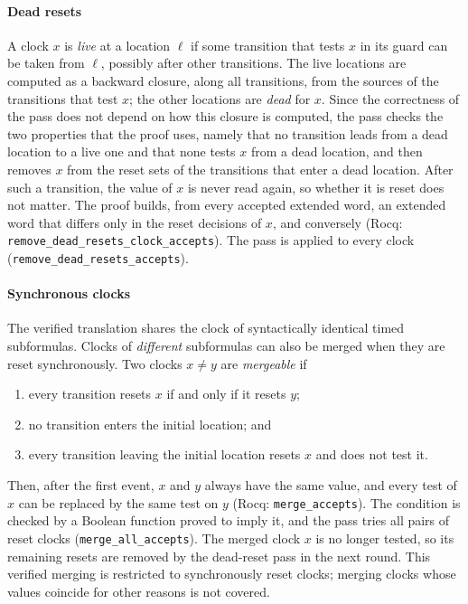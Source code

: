 \paragraph{Dead resets}
A clock $x$ is \emph{live} at a location $\ell$ if some transition that tests
$x$ in its guard can be taken from $\ell$, possibly after other transitions.
The live locations are computed as a backward closure, along all
transitions, from the sources of the transitions that test $x$; the other
locations are \emph{dead} for $x$.  Since the correctness of the pass does
not depend on how this closure is computed, the pass checks the two
properties that the proof uses, namely that no transition leads from a dead
location to a live one and that none tests $x$ from a dead location, and then removes $x$ from the reset sets of the
transitions that enter a dead location.  After such a transition, the value of
$x$ is never read again, so whether it is reset does not matter.  The proof
builds, from every accepted extended word, an extended word that differs only
in the reset decisions of $x$, and conversely (Rocq:
\texttt{remove\_\allowbreak{}dead\_\allowbreak{}resets\_\allowbreak{}clock\_\allowbreak{}accepts}).  The pass is applied
to every clock (\texttt{remove\_\allowbreak{}dead\_\allowbreak{}resets\_\allowbreak{}accepts}).

\paragraph{Synchronous clocks}
The verified translation shares the clock of syntactically identical timed
subformulas.  Clocks of \emph{different} subformulas can also be merged when
they are reset synchronously.  Two clocks $x\neq y$ are \emph{mergeable} if
\begin{enumerate}[label=(\roman*)]
  \item every transition resets $x$ if and only if it resets $y$;
  \item no transition enters the initial location; and
  \item every transition leaving the initial location resets $x$ and does not
        test it.
\end{enumerate}
Then, after the first event, $x$ and $y$ always have the same value, and every
test of $x$ can be replaced by the same test on $y$ (Rocq:
\texttt{merge\_\allowbreak{}accepts}).  The condition is checked by a Boolean function
proved to imply it, and the pass tries all pairs of reset clocks
(\texttt{merge\_\allowbreak{}all\_\allowbreak{}accepts}).  The merged clock $x$ is no longer tested,
so its remaining resets are removed by the dead-reset pass in the next round.
This verified merging is restricted to synchronously reset clocks; merging
clocks whose values coincide for other reasons is not covered.

